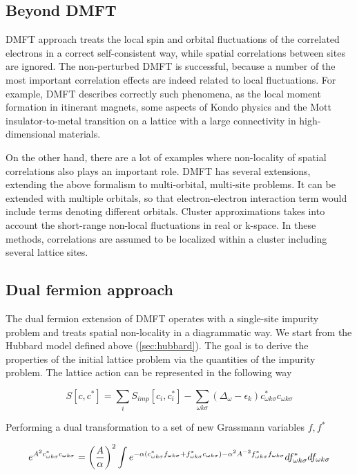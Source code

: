 \subsection{Beyond DMFT}
DMFT approach treats the local spin and orbital fluctuations of the correlated electrons in a correct self-consistent way,
 while spatial correlations between sites are ignored.
The non-perturbed DMFT is successful, because a number of the most important correlation effects are indeed related to local fluctuations.
For example, DMFT describes correctly such phenomena, as the local moment formation in itinerant magnets, some aspects of Kondo physics
 and the Mott insulator-to-metal transition on a lattice with a large connectivity in high-dimensional materials.

On the other hand, there are a lot of examples where non-locality of spatial correlations also plays an important role.
DMFT has several extensions, extending the above formalism to multi-orbital, multi-site problems.
It can be extended with multiple orbitals, so that electron-electron interaction term would include terms denoting different orbitals.
Cluster approximations takes into account the short-range non-local fluctuations in real or k-space.
In these methods, correlations are assumed to be localized within a cluster including several lattice sites.

\subsection{Dual fermion approach}
The dual fermion extension of DMFT\cite{0810.3819} operates with a single-site impurity problem and treats spatial non-locality in a diagrammatic way.
We start from the Hubbard model defined above (\autoref{sec:hubbard}).
The goal is to derive the properties of the initial lattice problem via the quantities of the impurity problem.
The lattice action can be represented in the following way

\begin{equation} S[c,c^*] = \sum_i S_{imp}[c_i,c_i^*] - \sum_{\omega k \sigma}(\Delta_\omega-\epsilon_k)c_{\omega k\sigma}^* c_{\omega k\sigma} \end{equation}

Performing a dual transformation to a set of new Grassmann variables $f,f^*$

\begin{equation} e^{A^2 c_{\omega k\sigma}^*c_{\omega k\sigma}} = \left(\frac{A}{\alpha}\right)^2 \int 
    e^{-\alpha(c_{\omega k\sigma}^*f_{\omega k\sigma}+f_{\omega k\sigma}^*c_{\omega k\sigma})-\alpha^2 A^{-2}f_{\omega k\sigma}^*f_{\omega k\sigma}}df_{\omega k\sigma}^*df_{\omega k\sigma}
 \end{equation}

